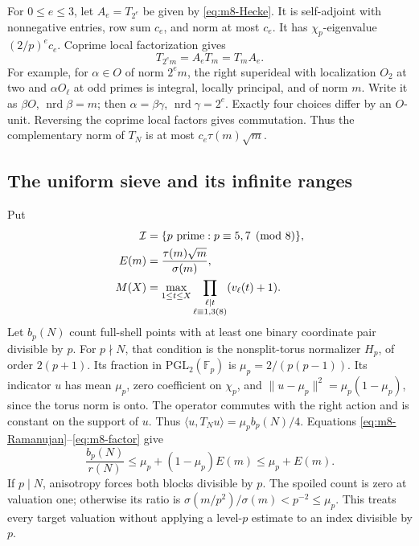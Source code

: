 For \(0\le e\le3\), let \(A_e=T_{2^e}\) be given by
\eqref{eq:m8-Hecke}. It is self-adjoint with nonnegative entries,
row sum \(c_e\), and norm at most \(c_e\).
It has \(\chi_p\)-eigenvalue
\((2/p)^ec_e\). Coprime local factorization gives
\begin{equation}
                       T_{2^em}=A_eT_m=T_mA_e.                \label{eq:m8-factor}
\end{equation}
For example, for \(\alpha\in O\) of norm \(2^em\), the right
superideal with localization \(O_2\) at two and
\(\alpha O_\ell\) at odd primes is integral, locally principal,
and of norm \(m\). Write it as \(\beta O\),
\(\operatorname{nrd}\beta=m\); then
\(\alpha=\beta\gamma\), \(\operatorname{nrd}\gamma=2^e\).
Exactly four choices differ by an \(O\)-unit. Reversing the
coprime local factors gives commutation. Thus the complementary
norm of \(T_N\) is at most \(c_e\tau(m)\sqrt m\).

\subsection{The uniform sieve and its infinite ranges}

Put
\[
\begin{aligned}
 \mathcal I&=\{p\ {\rm prime}:p\equiv5,7\pmod8\},\\
 E(m)&=\frac{\tau(m)\sqrt m}{\sigma(m)},\\
 M(X)&=\max_{1\le t\le X}
          \prod_{\substack{\ell\mid t\\\ell\equiv1,3(8)}}
                                      (v_\ell(t)+1).
\end{aligned}
\]
Let \(b_p(N)\) count full-shell points with at least one binary
coordinate pair divisible by \(p\).
For \(p\nmid N\), that condition is the nonsplit-torus normalizer
\(H_p\), of order \(2(p+1)\).
Its fraction in \(\mathrm{PGL}_2(\mathbb F_p)\) is
\(\mu_p=2/(p(p-1))\).
Its indicator \(u\) has mean \(\mu_p\), zero coefficient on
\(\chi_p\), and
\(\|u-\mu_p\|^2=\mu_p(1-\mu_p)\), since the torus norm is onto.
The operator commutes with the right action and is constant on
the support of \(u\). Thus
\(\langle u,T_Nu\rangle=\mu_pb_p(N)/4\).
Equations \eqref{eq:m8-Ramanujan}--\eqref{eq:m8-factor} give
\begin{equation}
                  \frac{b_p(N)}{r(N)}
                      \le\mu_p+(1-\mu_p)E(m)
                      \le\mu_p+E(m).                          \label{eq:m8-small}
\end{equation}
If \(p\mid N\), anisotropy forces both blocks divisible by \(p\).
The spoiled count is zero at valuation one; otherwise its ratio
is \(\sigma(m/p^2)/\sigma(m)<p^{-2}\le\mu_p\).
This treats every target valuation without applying a
level-\(p\) estimate to an index divisible by \(p\).


